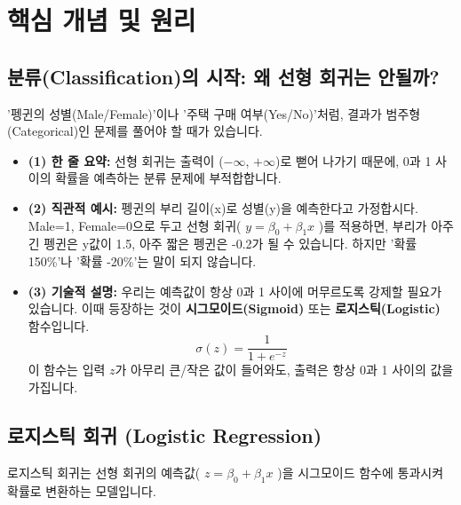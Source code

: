 \documentclass[11pt,a4paper]{book}
\theoremstyle{definition}
\begin{document}
\section{핵심 개념 및 원리}

\subsection{분류(Classification)의 시작: 왜 선형 회귀는 안될까?}

'펭귄의 성별(Male/Female)'이나 '주택 구매 여부(Yes/No)'처럼, 결과가 범주형(Categorical)인 문제를 풀어야 할 때가 있습니다.

\begin{itemize}
    \item \textbf{(1) 한 줄 요약:} 선형 회귀는 출력이 ($-\infty$, $+\infty$)로 뻗어 나가기 때문에, 0과 1 사이의 확률을 예측하는 분류 문제에 부적합합니다.
    \item \textbf{(2) 직관적 예시:} 펭귄의 부리 길이(x)로 성별(y)을 예측한다고 가정합시다. Male=1, Female=0으로 두고 선형 회귀( $y = \beta_0 + \beta_1 x$ )를 적용하면, 부리가 아주 긴 펭귄은 y값이 1.5, 아주 짧은 펭귄은 -0.2가 될 수 있습니다. 하지만 '확률 150\%'나 '확률 -20\%'는 말이 되지 않습니다.
    \item \textbf{(3) 기술적 설명:} 우리는 예측값이 항상 0과 1 사이에 머무르도록 강제할 필요가 있습니다. 이때 등장하는 것이 \textbf{시그모이드(Sigmoid)} 또는 \textbf{로지스틱(Logistic)} 함수입니다.
    $$ \sigma(z) = \frac{1}{1 + e^{-z}} $$
    이 함수는 입력 $z$가 아무리 큰/작은 값이 들어와도, 출력은 항상 0과 1 사이의 값을 가집니다.
    \end{itemize}

\subsection{로지스틱 회귀 (Logistic Regression)}

로지스틱 회귀는 선형 회귀의 예측값( $z = \beta_0 + \beta_1 x$ )을 시그모이드 함수에 통과시켜 확률로 변환하는 모델입니다.
\end{document}
